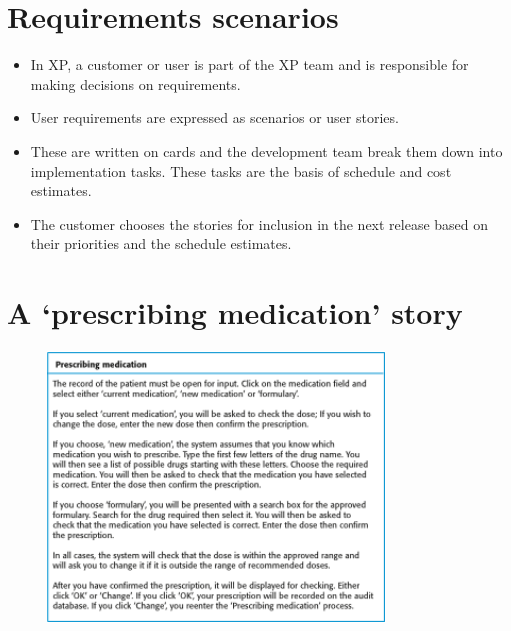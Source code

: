 \section{ Requirements scenarios}
\begin{itemize}

\item In XP, a customer or user is part of the XP team and is responsible for making decisions on requirements.

\item User requirements are expressed as scenarios or user stories.

\item These are written on cards and the development team break them down into implementation tasks. These tasks are the basis of schedule and cost estimates.

\item The customer chooses the stories for inclusion in the next release based on their priorities and the schedule estimates.

\end{itemize}
\section{ A ‘prescribing medication’ story}
\begin{figure}[h!]
    \centering
    \includegraphics[width = 0.8\textwidth]{./figures/L2_4.png}
    \caption{}
    \label{fig:L2_4}
\end{figure}



